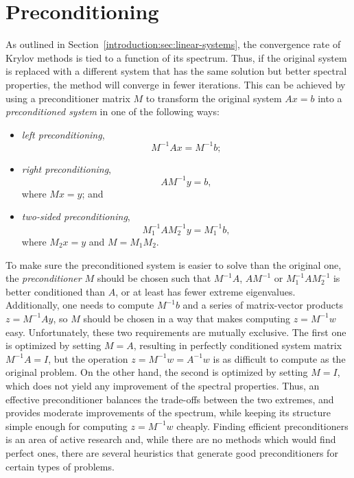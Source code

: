 \section{Preconditioning}

As outlined in Section~\ref{introduction:sec:linear-systems}, the convergence
rate of Krylov methods is tied to a function of its spectrum. Thus, if the
original system is replaced with a different system that has the same solution
but better spectral properties, the method will converge in fewer iterations.
This can be achieved by using a preconditioner matrix $M$ to  transform the
original system $Ax = b$ into a \emph{preconditioned system} in one of the
following ways:
\begin{itemize}
\item \emph{left preconditioning},
\begin{equation}
    M^{-1}Ax = M^{-1}b;
\end{equation}
\item \emph{right preconditioning},
\begin{equation}
    AM^{-1}y = b,
\end{equation}
where $Mx = y$; and
\item \emph{two-sided preconditioning},
\begin{equation}
    M_1^{-1}AM_2^{-1} y = M_1^{-1}b,
\end{equation}
where $M_2x = y$ and $M = M_1 M_2$.
\end{itemize}

To make sure the preconditioned system is easier to solve than the original one,
the \emph{preconditioner} $M$ should be chosen such that $M^{-1}A$,
$AM^{-1}$ or $M_1^{-1}AM_2^{-1}$ is better conditioned than $A$, or at least has
fewer extreme eigenvalues. Additionally, one needs to compute $M^{-1}b$ and a
series of matrix-vector products $z = M^{-1}Ay$, so $M$ should be chosen in a
way that makes computing $z = M^{-1}w$ easy. Unfortunately, these two
requirements are mutually exclusive. The first one is optimized by setting
$M = A$, resulting in perfectly conditioned system matrix $M^{-1}A = I$, but
the operation $z = M^{-1}w = A^{-1}w$ is as difficult to compute as the original
problem.  On the other hand, the second is optimized by setting $M = I$, which
does not yield any improvement of the spectral properties. Thus, an effective
preconditioner balances the trade-offs between the two extremes, and provides
moderate improvements of the spectrum, while keeping its structure simple enough
for computing $z = M^{-1}w$ cheaply. Finding efficient preconditioners is an
area of active research and, while there are no methods which would find perfect
ones, there are several heuristics that generate good preconditioners for
certain types of problems.

